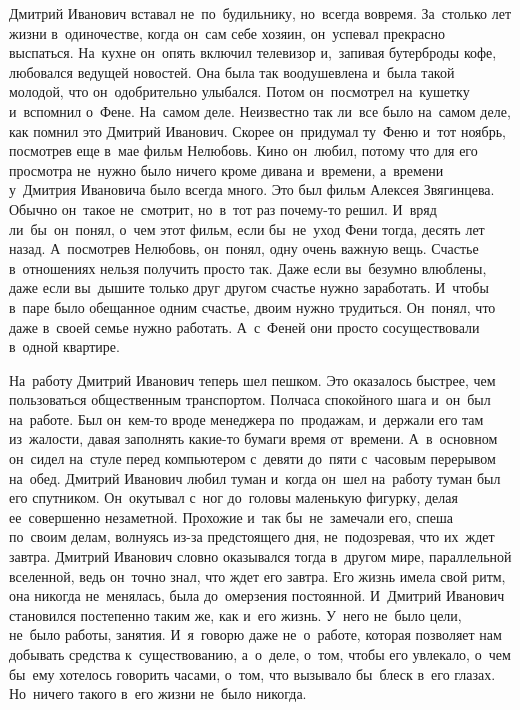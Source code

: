 Дмитрий Иванович вставал не~по~будильнику, но~всегда вовремя.
За~столько лет жизни в~одиночестве, когда он~сам себе хозяин, он~успевал прекрасно выспаться.
На~кухне он~опять включил телевизор и,~запивая бутерброды кофе, любовался ведущей новостей.
Она была так воодушевлена и~была такой молодой, что он~одобрительно улыбался.
Потом он~посмотрел на~кушетку и~вспомнил о~Фене.
На~самом деле.
Неизвестно так ли~все было на~самом деле, как помнил это Дмитрий Иванович.
Скорее он~придумал ту~Феню и~тот ноябрь, посмотрев еще в~мае фильм Нелюбовь.
Кино он~любил, потому что для его просмотра не~нужно было ничего кроме дивана и~времени, а~времени у~Дмитрия Ивановича было всегда много.
Это был фильм Алексея Звягинцева.
Обычно он~такое не~смотрит, но~в~тот раз почему-то решил.
И~вряд ли~бы~он~понял, о~чем этот фильм, если бы~не~уход Фени тогда, десять лет назад.
А~посмотрев Нелюбовь, он~понял, одну очень важную вещь.
Счастье в~отношениях нельзя получить просто так.
Даже если вы~безумно влюблены, даже если вы~дышите только друг другом счастье нужно заработать.
И~чтобы в~паре было обещанное одним счастье, двоим нужно трудиться.
Он~понял, что даже в~своей семье нужно работать.
А~с~Феней они просто сосуществовали в~одной квартире.
 
На~работу Дмитрий Иванович теперь шел пешком.
Это оказалось быстрее, чем пользоваться общественным транспортом.
Полчаса спокойного шага и~он~был на~работе.
Был он~кем-то вроде менеджера по~продажам, и~держали его там из~жалости, давая заполнять какие-то бумаги время от~времени.
А~в~основном он~сидел на~стуле перед компьютером с~девяти до~пяти с~часовым перерывом на~обед.
Дмитрий Иванович любил туман и~когда он~шел на~работу туман был его спутником.
Он~окутывал с~ног до~головы маленькую фигурку, делая ее~совершенно незаметной.
Прохожие и~так бы~не~замечали его, спеша по~своим делам, волнуясь из-за предстоящего дня, не~подозревая, что их~ждет завтра.
Дмитрий Иванович словно оказывался тогда в~другом мире, параллельной вселенной, ведь он~точно знал, что ждет его завтра.
Его жизнь имела свой ритм, она никогда не~менялась, была до~омерзения постоянной.
И~Дмитрий Иванович становился постепенно таким же, как и~его жизнь.
У~него не~было цели, не~было работы, занятия.
И~я~говорю даже не~о~работе, которая позволяет нам добывать средства к~существованию, а~о~деле, о~том, чтобы его увлекало, о~чем бы~ему хотелось говорить часами, о~том, что вызывало бы~блеск в~его глазах.
Но~ничего такого в~его жизни не~было никогда.

